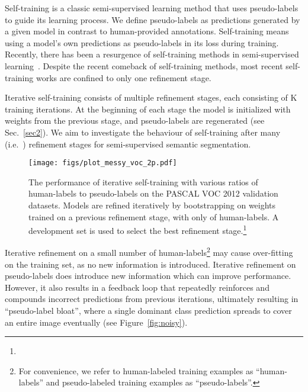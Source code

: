 \documentclass[10pt, conference, compsocconf]{IEEEtran}
\begin{document}
Self-training is a classic semi-supervised learning method that uses pseudo-labels to guide its learning process. We define pseudo-labels as predictions generated by a given model in contrast to human-provided annotations. Self-training means using a model's own predictions as pseudo-labels in its loss during training.
Recently, there has been a resurgence of self-training methods in semi-supervised learning~\cite{lee2013pseudo,radosavovic2018data,zhai2019s4l,zoph2020rethinking,xie2020self}.
Despite the recent comeback of self-training methods, most recent self-training works are confined to only one refinement stage.

Iterative self-training consists of multiple refinement stages, each consisting of K training iterations. At the beginning of each stage the model is initialized with weights from the previous stage, and pseudo-labels are regenerated (see Sec.~\ref{sec2}). We aim to investigate the behaviour of self-training after many (i.e.~) refinement stages for semi-supervised semantic segmentation.



\begin{figure}[htb]
  \centering
  \texttt{[image: figs/plot\_messy\_voc\_2p.pdf]}
  \caption{
  The performance of iterative self-training with various ratios of human-labels to pseudo-labels  on the PASCAL VOC 2012 validation datasets. Models are refined iteratively by bootstrapping on weights trained on a previous refinement stage, with only  of human-labels. A development set is used to select the best refinement stage.\protect\footnote[2]{}
  }
  \label{fig:voc}
\end{figure}

Iterative refinement on a small number of human-labels\footnote{For convenience, we refer to human-labeled training examples as ``human-labels'' and pseudo-labeled training examples as ``pseudo-labels''.} 
may cause over-fitting on the training set, as no new information is introduced. Iterative refinement on pseudo-labels 
does introduce new information which can improve performance. However, it also results in a feedback loop that repeatedly reinforces and compounds incorrect predictions from previous iterations, ultimately resulting in ``pseudo-label bloat'', where a single dominant class prediction spreads to cover an entire image eventually (see Figure~\ref{fig:noisy}).
\end{document}
